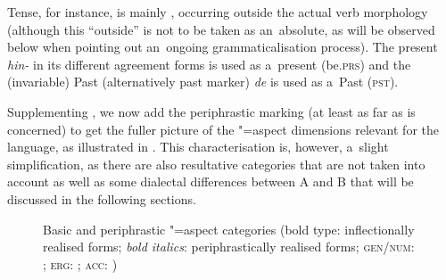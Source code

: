 Tense, for instance, is mainly , occurring outside the actual verb morphology (although this ``outside'' is not to be taken as an~absolute, as will be observed below when pointing out an~ongoing grammaticalisation process). The present   \textit{hin-} in its different agreement forms is used as a~present   (be.\textsc{prs}) and the (invariable) Past   (alternatively past  marker) \textit{de} is used as a~Past   (\textsc{pst}).



Supplementing , we now add the periphrastic marking (at least as far as  is concerned) to get the fuller picture of the "=aspect dimensions relevant for the language, as illustrated in . This characterisation is, however, a~slight simplification, as there are also resultative categories that are not taken into account as well as some dialectal differences between A and B that will be discussed in the following sections.


\begin{figure}[ht]
\centering
{}
\caption{Basic and periphrastic "=aspect categories (bold type: inflectionally realised forms;
  \textit{bold italics}: periphrastically realised forms; \textsc{gen/num}: ;
  \textsc{erg}: ; \textsc{acc}:  )\label{fig:9-2}}
\end{figure}

